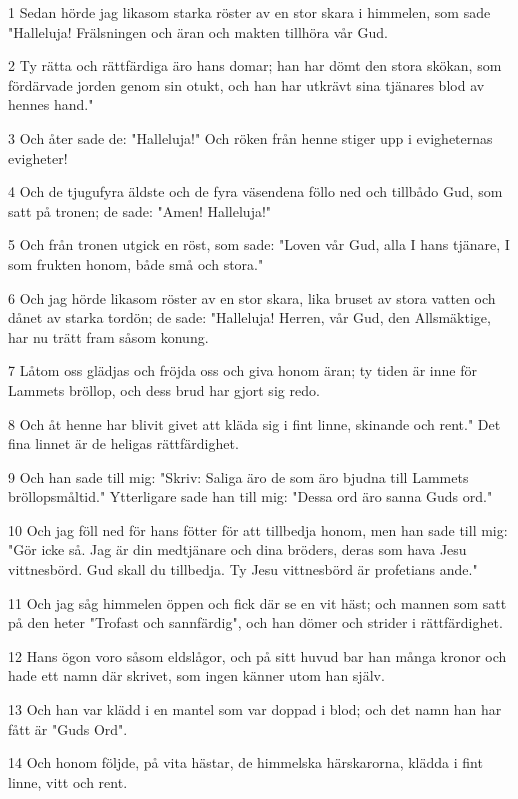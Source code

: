 \par 1 Sedan hörde jag likasom starka röster av en stor skara i himmelen, som sade "Halleluja! Frälsningen och äran och makten tillhöra vår Gud.
\par 2 Ty rätta och rättfärdiga äro hans domar; han har dömt den stora skökan, som fördärvade jorden genom sin otukt, och han har utkrävt sina tjänares blod av hennes hand."
\par 3 Och åter sade de: "Halleluja!" Och röken från henne stiger upp i evigheternas evigheter!
\par 4 Och de tjugufyra äldste och de fyra väsendena föllo ned och tillbådo Gud, som satt på tronen; de sade: "Amen! Halleluja!"
\par 5 Och från tronen utgick en röst, som sade: "Loven vår Gud, alla I hans tjänare, I som frukten honom, både små och stora."
\par 6 Och jag hörde likasom röster av en stor skara, lika bruset av stora vatten och dånet av starka tordön; de sade: "Halleluja! Herren, vår Gud, den Allsmäktige, har nu trätt fram såsom konung.
\par 7 Låtom oss glädjas och fröjda oss och giva honom äran; ty tiden är inne för Lammets bröllop, och dess brud har gjort sig redo.
\par 8 Och åt henne har blivit givet att kläda sig i fint linne, skinande och rent." Det fina linnet är de heligas rättfärdighet.
\par 9 Och han sade till mig: "Skriv: Saliga äro de som äro bjudna till Lammets bröllopsmåltid." Ytterligare sade han till mig: "Dessa ord äro sanna Guds ord."
\par 10 Och jag föll ned för hans fötter för att tillbedja honom, men han sade till mig: "Gör icke så. Jag är din medtjänare och dina bröders, deras som hava Jesu vittnesbörd. Gud skall du tillbedja. Ty Jesu vittnesbörd är profetians ande."
\par 11 Och jag såg himmelen öppen och fick där se en vit häst; och mannen som satt på den heter "Trofast och sannfärdig", och han dömer och strider i rättfärdighet.
\par 12 Hans ögon voro såsom eldslågor, och på sitt huvud bar han många kronor och hade ett namn där skrivet, som ingen känner utom han själv.
\par 13 Och han var klädd i en mantel som var doppad i blod; och det namn han har fått är "Guds Ord".
\par 14 Och honom följde, på vita hästar, de himmelska härskarorna, klädda i fint linne, vitt och rent.
